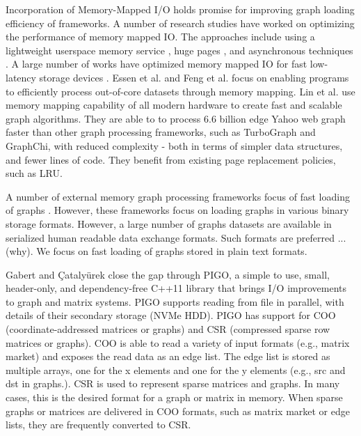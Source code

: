 Incorporation of Memory-Mapped I/O holds promise for improving graph loading efficiency of frameworks. A number of research studies have worked on optimizing the performance of memory mapped IO. The approaches include using a lightweight userspace memory service \cite{li2019userland}, huge pages \cite{malliotakis2021hugemap}, and asynchronous techniques \cite{imamura2019poster}. A large number of works have optimized memory mapped IO for fast low-latency storage devices \cite{song2012low, song2016efficient, papagiannis2020optimizing, papagiannis2021memory, alverti2022daxvm, leis2023virtual}. Essen et al. \cite{van2015di} and Feng et al. \cite{feng2023tricache} focus on enabling programs to efficiently process out-of-core datasets through memory mapping. Lin et al. \cite{lin2014mmap} use memory mapping capability of all modern hardware to create fast and scalable graph algorithms. They are able to to process $6.6$ billion edge Yahoo web graph faster than other graph processing frameworks, such as TurboGraph and GraphChi, with reduced complexity - both in terms of simpler data structures, and fewer lines of code. They benefit from existing page replacement policies, such as LRU.

A number of external memory graph processing frameworks focus of fast loading of graphs \cite{}. However, these frameworks focus on loading graphs in various binary storage formats. However, a large number of graphs datasets are available in serialized human readable data exchange formats. Such formats are preferred ... (why). We focus on fast loading of graphs stored in plain text formats.

Gabert and Çatalyürek \cite{gabert2021pigo} close the gap through PIGO, a simple to use, small, header-only, and dependency-free C++11 library that brings I/O improvements to graph and matrix systems. PIGO supports reading from file in parallel, with details of their secondary storage (NVMe HDD). PIGO has support for COO (coordinate-addressed matrices or graphs) and CSR (compressed sparse row matrices or graphs). COO is able to read a variety of input formats (e.g., matrix market) and exposes the read data as an edge list. The edge list is stored as multiple arrays, one for the x elements and one for the y elements (e.g., src and dst in graphs.). CSR is used to represent sparse matrices and graphs. In many cases, this is the desired format for a graph or matrix in memory. When sparse graphs or matrices are delivered in COO formats, such as matrix market or edge lists, they are frequently converted to CSR.

